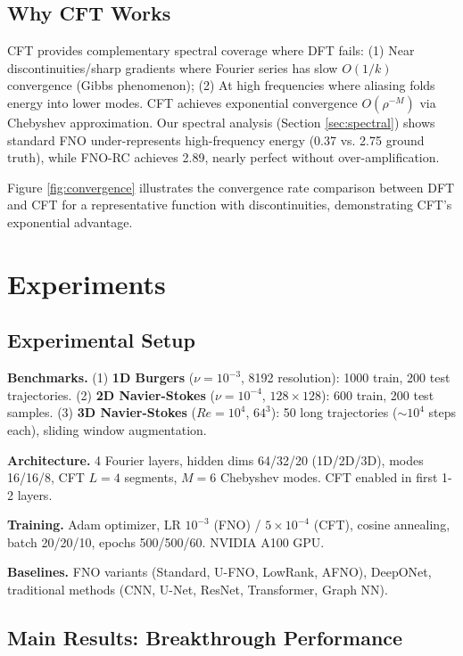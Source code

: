 \documentclass[11pt]{article}
\begin{document}
\subsection{Why CFT Works}

CFT provides complementary spectral coverage where DFT fails: (1) Near discontinuities/sharp gradients where Fourier series has slow $O(1/k)$ convergence (Gibbs phenomenon); (2) At high frequencies where aliasing folds energy into lower modes. CFT achieves exponential convergence $O(\rho^{-M})$ via Chebyshev approximation. Our spectral analysis (Section \ref{sec:spectral}) shows standard FNO under-represents high-frequency energy (0.37 vs. 2.75 ground truth), while FNO-RC achieves 2.89, nearly perfect without over-amplification.

Figure \ref{fig:convergence} illustrates the convergence rate comparison between DFT and CFT for a representative function with discontinuities, demonstrating CFT's exponential advantage.

\section{Experiments}

\subsection{Experimental Setup}

\textbf{Benchmarks.} (1) \textbf{1D Burgers} ($\nu = 10^{-3}$, 8192 resolution): 1000 train, 200 test trajectories. (2) \textbf{2D Navier-Stokes} ($\nu = 10^{-4}$, $128 \times 128$): 600 train, 200 test samples. (3) \textbf{3D Navier-Stokes} ($Re = 10^4$, $64^3$): 50 long trajectories ($\sim 10^4$ steps each), sliding window augmentation.

\textbf{Architecture.} 4 Fourier layers, hidden dims 64/32/20 (1D/2D/3D), modes 16/16/8, CFT $L=4$ segments, $M=6$ Chebyshev modes. CFT enabled in first 1-2 layers.

\textbf{Training.} Adam optimizer, LR $10^{-3}$ (FNO) / $5 \times 10^{-4}$ (CFT), cosine annealing, batch 20/20/10, epochs 500/500/60. NVIDIA A100 GPU.

\textbf{Baselines.} FNO variants (Standard, U-FNO, LowRank, AFNO), DeepONet, traditional methods (CNN, U-Net, ResNet, Transformer, Graph NN).

\subsection{Main Results: Breakthrough Performance}
\end{document}
